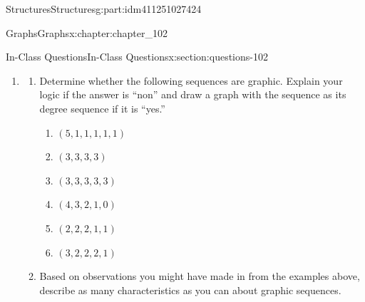 \documentclass[oneside,10pt,]{book}
\numberwithin{equation}{section}
\begin{document}
\begin{partptx}{Structures}{}{Structures}{}{}{g:part:idm411251027424}
\begin{chapterptx}{Graphs}{}{Graphs}{}{}{x:chapter:chapter_102}
\begin{sectionptx}{In-Class Questions}{}{In-Class Questions}{}{}{x:section:questions-102}
\begin{enumerate}[label=\arabic*.]
\item{}%
\begin{enumerate}[label=(\alph*)]
\item{}Determine whether the following sequences are graphic. Explain your logic if the answer is ``non'' and draw a graph with the sequence as its degree sequence if it is ``yes.''%
\begin{enumerate}[label=\roman*]
\item{}\((5,1,1,1,1,1)\)%
\item{}\((3,3,3,3)\)%
\item{}\((3,3,3,3,3)\)%
\item{}\((4,3,2,1,0)\)%
\item{}\((2,2,2,1,1)\)%
\item{}\((3,2,2,2,1)\)%
\end{enumerate}
%
\item{}Based on observations you might have made in from the examples above, describe as many characteristics as you can about graphic sequences.%
\end{enumerate}
%
\end{enumerate}
%
\end{sectionptx}
\end{chapterptx}
\end{partptx}
%
\backmatter
%
%
%
%
%
\typeout{************************************************}
\typeout{************************************************}
%
\end{document}
